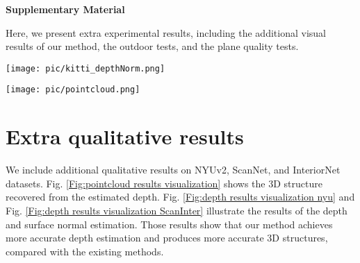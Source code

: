 \documentclass[10pt,twocolumn,letterpaper]{article}
\newcommand{\Fig}[1]{Fig. \ref{#1}}
\begin{document}
{\small
	
	
}





\newpage




\setcounter{section}{0}
\setcounter{equation}{0}
\setcounter{figure}{0}
\setcounter{table}{0}
\setcounter{page}{1}
\makeatletter
\renewcommand{\theequation}{S\arabic{equation}}
\renewcommand{\thefigure}{S\arabic{figure}}




\begin{center}
	\textbf{\large Supplementary Material}
\end{center}




Here, we present extra experimental results, including the additional visual results of our method, the outdoor tests, and the plane quality tests.


\begin{figure*}[h]
	\centering
	\texttt{[image: pic/kitti\_depthNorm.png]}
	\caption{Visualization of the KITTI results. From top to bottom rows: the input image, the estimated depth, the aligned surface normal, and the planar regions detected by our method based on the color and geometric information.} 
	\label{Fig:kitti results visualization}
\end{figure*}

\begin{figure*}[h]
	\centering
	\texttt{[image: pic/pointcloud.png]}	\caption{Point cloud visualization on NYUv2, ScanNet and InteriorNet results. We present the point cloud results of Monodepth2\cite{godard2019digging}, \cite{yu2020p}, our method, and the ground-truth.	We draw the dominant directions in the scene for better comparison. The results show that our method produces more accurate 3D structures.
	} 
	\label{Fig:pointcloud results visualization}
\end{figure*}

\section{Extra qualitative results}
We include additional qualitative results on NYUv2, ScanNet, and InteriorNet datasets.
\Fig{Fig:pointcloud results visualization} shows the 3D structure recovered from the estimated depth.
\Fig{Fig:depth results visualization nyu} and \Fig{Fig:depth results visualization ScanInter} illustrate the results of the depth and surface normal estimation.
Those results show that our method achieves more accurate depth estimation and produces more accurate 3D structures, compared with the existing methods.
\end{document}
